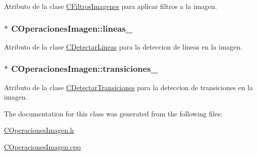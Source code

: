 Atributo de la clase \hyperlink{classCFiltrosImagenes}{C\+Filtros\+Imagenes} para aplicar filtros a la imagen. 

\subsubsection[{\texorpdfstring{lineas\+\_\+}{lineas_}}]{$\ast$ C\+Operaciones\+Imagen\+::lineas\+\_\+\hspace{0.3cm}{\ttfamily [private]}}\hypertarget{classCOperacionesImagen_a50efc40444cef260102dc2ceb6d4c608}{}\label{classCOperacionesImagen_a50efc40444cef260102dc2ceb6d4c608}


Atributo de la clase \hyperlink{classCDetectarLineas}{C\+Detectar\+Lineas} para la deteccion de lineas en la imagen. 

\subsubsection[{\texorpdfstring{transiciones\+\_\+}{transiciones_}}]{$\ast$ C\+Operaciones\+Imagen\+::transiciones\+\_\+\hspace{0.3cm}{\ttfamily [private]}}\hypertarget{classCOperacionesImagen_a7ca38abb7714e00773895e8bcda443c1}{}\label{classCOperacionesImagen_a7ca38abb7714e00773895e8bcda443c1}


Atributo de la clase \hyperlink{classCDetectarTransiciones}{C\+Detectar\+Transiciones} para la deteccion de transiciones en la imagen. 



The documentation for this class was generated from the following files\+:\begin{DoxyCompactItemize}
\item 
\hyperlink{COperacionesImagen_8h}{C\+Operaciones\+Imagen.\+h}\item 
\hyperlink{COperacionesImagen_8cpp}{C\+Operaciones\+Imagen.\+cpp}\end{DoxyCompactItemize}
